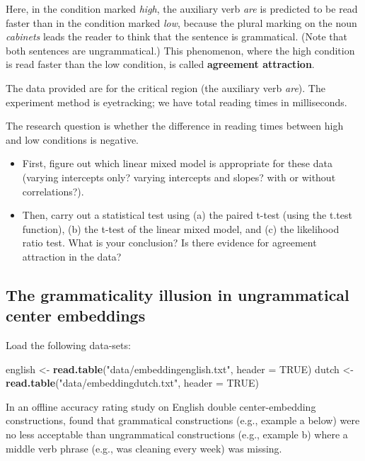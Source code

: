 \documentclass[12pt,]{krantz}
\newenvironment{Shaded}{\begin{snugshade}}{\end{snugshade}}
\newcommand{\DataTypeTok}[1]{\textcolor[rgb]{0.13,0.29,0.53}{#1}}
\newcommand{\KeywordTok}[1]{\textcolor[rgb]{0.13,0.29,0.53}{\textbf{#1}}}
\newcommand{\NormalTok}[1]{#1}
\newcommand{\OtherTok}[1]{\textcolor[rgb]{0.56,0.35,0.01}{#1}}
\newcommand{\StringTok}[1]{\textcolor[rgb]{0.31,0.60,0.02}{#1}}
\providecommand{\tightlist}{%
  \setlength{\itemsep}{0pt}\setlength{\parskip}{0pt}}
\begin{document}
Here, in the condition marked \emph{high}, the auxiliary verb \emph{are} is predicted to be read faster than in the condition marked \emph{low}, because the plural marking on the noun \emph{cabinets} leads the reader to think that the sentence is grammatical. (Note that both sentences are ungrammatical.) This phenomenon, where the high condition is read faster than the low condition, is called \textbf{agreement attraction}.

The data provided are for the critical region (the auxiliary verb \emph{are}). The experiment method is eyetracking; we have total reading times in milliseconds.

The research question is whether the difference in reading times between high and low conditions is negative.

\begin{itemize}
\tightlist
\item
  First, figure out which linear mixed model is appropriate for these data (varying intercepts only? varying intercepts and slopes? with or without correlations?).
\item
  Then, carry out a statistical test using (a) the paired t-test (using the t.test function), (b) the t-test of the linear mixed model, and (c) the likelihood ratio test. What is your conclusion? Is there evidence for agreement attraction in the data?
\end{itemize}

\hypertarget{sec:HypTestExerciseAgrmt}{%
\subsection{The grammaticality illusion in ungrammatical center embeddings}\label{sec:HypTestExerciseAgrmt}}

Load the following data-sets:

\begin{Shaded}
\begin{Highlighting}[]
\NormalTok{english <-}\StringTok{ }\KeywordTok{read.table}\NormalTok{(}\StringTok{"data/embeddingenglish.txt"}\NormalTok{, }
  \DataTypeTok{header =} \OtherTok{TRUE}\NormalTok{)}
\NormalTok{dutch <-}\StringTok{ }\KeywordTok{read.table}\NormalTok{(}\StringTok{"data/embeddingdutch.txt"}\NormalTok{, }
  \DataTypeTok{header =} \OtherTok{TRUE}\NormalTok{)}
\end{Highlighting}
\end{Shaded}

In an offline accuracy rating study on English double center-embedding constructions, \citet{gibsonthomas97} found that grammatical constructions (e.g., example a below) were no less acceptable than ungrammatical constructions (e.g., example b) where a middle verb phrase (e.g., was cleaning every week) was missing.
\end{document}
